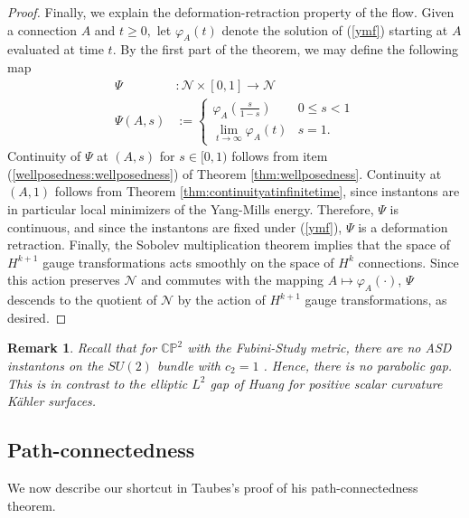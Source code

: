 \documentclass[12pt]{amsart}
\newcommand{\CP}{{\mathbb{CP}}}
\renewcommand{\1}{{\mathbf 1}}
\newcommand{\SU}{{\mathrm{SU} }}
\newcommand{\calN}{\mathcal{N}}
\theoremstyle{others}
\newtheorem{rmk}[thm]{Remark}
\numberwithin{equation}{section}
\begin{document}
\begin{proof}
     Finally, we explain the deformation-retraction property of the flow. Given a connection $A$ and $t \geq 0,$ let $\varphi_A(t)$ denote the solution of (\ref{ymf}) starting at $A$ evaluated at time $t.$ By the first part of the theorem, we may define the following map
    \begin{align*}
        \Psi &: \calN \times [0, 1] \to \calN \\
        \Psi(A, s) &:= 
        \begin{cases}
            \varphi_A\left(\frac{s}{1-s}\right) & 0 \leq s < 1 \\
            \lim_{t \to \infty} \varphi_A(t) & s = 1.
        \end{cases}
    \end{align*} Continuity of \(\Psi\) at \((A, s)\) for \(s \in [0, 1)\) follows from item (\ref{wellposedness:wellposedness}) of Theorem \ref{thm:wellposedness}. Continuity at \((A, 1)\) follows from Theorem \ref{thm:continuityatinfinitetime}, since instantons are in particular local minimizers of the Yang-Mills energy. Therefore, \(\Psi\) is continuous, and since the instantons are fixed under (\ref{ymf}), \(\Psi\) is a deformation retraction. Finally, the Sobolev multiplication theorem implies that the space of \(H^{k+1}\) gauge transformations acts smoothly on the space of \(H^k\) connections. Since this action preserves \(\calN\) and commutes with the mapping \(A \mapsto \varphi_A(\cdot)\), \(\Psi\) descends to the quotient of \(\calN\) by the action of \(H^{k+1}\) gauge transformations, as desired.
\end{proof}

\begin{rmk}
   Recall that for \(\CP^2\) with the Fubini-Study metric, there are no ASD instantons on the \(SU(2)\) bundle with \(c_2 = 1\) \cite[4.1.3, Example (iii)]{donkron}. Hence, there is no parabolic gap. This is in contrast to the elliptic \(L^2\) gap of Huang \cite{huangkahlersurfaces} for positive scalar curvature K{\"a}hler surfaces.
\end{rmk}



\vspace{5mm}


\subsection{Path-connectedness}\label{ss:pathconnected} We now describe our shortcut in Taubes's proof of his path-connectedness theorem. %
\end{document}

